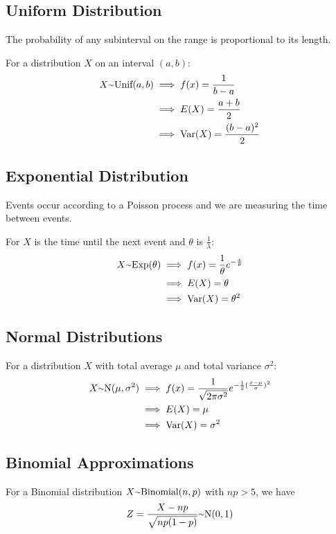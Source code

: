 \documentclass[12pt]{article}
\begin{document}
\subsection*{Uniform Distribution}
The probability of any subinterval on the range is proportional to its length.

For a distribution $X$ on an interval $(a, b)$:
\begin{align*}
X \ttilde \text{Unif}(a,b) &\implies f(x) = \frac{1}{b-a}\\
                           &\implies E(X) = \frac{a+b}{2}\\
                           &\implies \text{Var}(X) = \frac{(b-a)^2}{2}
\end{align*}

\subsection*{Exponential Distribution}
Events occur according to a Poisson process and we are measuring the time between events.

For $X$ is the time until the next event and $\theta$ is $\frac{1}{\lambda}$:
\begin{align*}
X \ttilde \text{Exp}(\theta) &\implies f(x) = \frac{1}{\theta} e^{-\frac{x}{\theta}}\\
                             &\implies E(X) = \theta\\
                             &\implies \text{Var}(X) = \theta^2
\end{align*}

\subsection*{Normal Distributions}
For a distribution $X$ with total average $\mu$ and total variance $\sigma^2$:
\begin{align*}
X \ttilde \text{N}(\mu, \sigma^2) &\implies f(x) = \frac{1}{\sqrt{2\pi\sigma^2}} e^{-\half (\frac{x-\mu}{\sigma})^2}\\
                                  &\implies E(X) = \mu\\
                                  &\implies \text{Var}(X) = \sigma^2
\end{align*}

\subsection*{Binomial Approximations}
For a Binomial distribution $X \ttilde \text{Binomial}(n,p)$ with $np > 5$, we have \[ Z = \frac{X - np}{\sqrt{np(1-p)}} \ttilde \text{N}(0,1) \]
\end{document}
